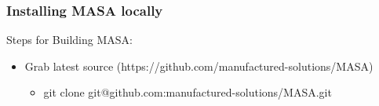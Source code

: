 \documentclass[mathserif]{beamer}
\begin{document}
%
%
%
\begin{frame}
  \frametitle{Installing MASA locally}
  \begin{block}{Steps for Building MASA:}
    \begin{itemize}
      \item Grab latest source (https://github.com/manufactured-solutions/MASA)
	    \begin{itemize}
	     \item git clone git@github.com:manufactured-solutions/MASA.git
	    \end{itemize}
     \end{itemize}
   \end{block}

\begin{center}
\small
{}
\end{center}
 
\end{frame}
\end{document}
